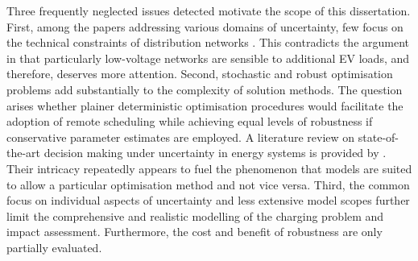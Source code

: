 Three frequently neglected issues detected motivate the scope of this dissertation. First, among the papers addressing various domains of uncertainty, few focus on the technical constraints of distribution networks \cite{Mehri2017, OConnell2014, Soroudi2014}. This contradicts the argument in  that particularly low-voltage networks are sensible to additional EV loads, and therefore, deserves more attention. Second, stochastic and robust optimisation problems add substantially to the complexity of solution methods. The question arises whether plainer deterministic optimisation procedures would facilitate the adoption of remote scheduling while achieving equal levels of robustness if conservative parameter estimates are employed. A literature review on \mbox{state-of-the-art} decision making under uncertainty in energy systems is provided by \cite{Soroudi2013b}. Their intricacy repeatedly appears to fuel the phenomenon that models are suited to allow a particular optimisation method and not vice versa. Third, the common focus on individual aspects of uncertainty and less extensive model scopes further limit the comprehensive and realistic modelling of the charging problem and impact assessment. Furthermore, the cost and benefit of robustness are only partially evaluated.

